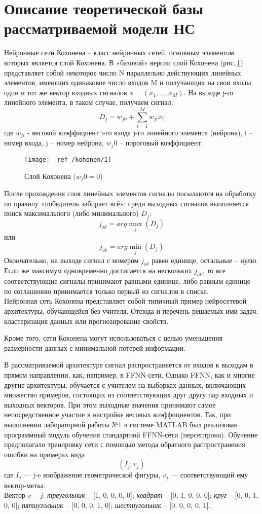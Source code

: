 \documentclass[12pt,a4paper]{article}
\begin{document}
\section{Описание теоретической базы рассматриваемой \newline модели НС}
Нейронные сети Кохонена – класс нейронных сетей, основным элементом которых является слой Кохонена. В «базовой» версии слой Кохонена (рис.\,\ref{fig:01}) 
представляет собой некоторое число N параллельно действующих линейных элементов, имеющих одинаковое число входов M и получающих на свои входы один и тот же вектор входных сигналов $x = (x_1, ..., x_M)$. На выходе j-го линейного элемента, в таком случае, получаем сигнал:
$$D_j = w_{j0} + \sum\limits_{i=1}^{M} w_{ji} x_i $$
где $w_{ji}$ - весовой коэффициент i-го входа j-го линейного элемента (нейрона), i – номер входа, j – номер нейрона, $w_j0$ – пороговый коэффициент.

\begin{figure}[h!]
	\centering
	\texttt{[image: \_ref\_/kohonen/1]}
	\caption{Слой Кохонена ($w_j0 = 0$)\label{fig:01}}
\end{figure}

После прохождения слоя линейных элементов сигналы посылаются на обработку по правилу «победитель забирает всё»: среди выходных сигналов выполняется поиск максимального (либо минимального) $D_j$:
$$ j_{ok} = arg\max_{j}(D_j) $$
или
$$ j_{ok} = arg\min_{j}(D_j) $$
Окончательно, на выходе сигнал с номером $j_{ok}$ равен единице, остальные – нулю. Если же максимум одновременно достигается на нескольких $j_{ok}$, то все соответствующие сигналы принимают равными единице, либо равным единице по соглашению принимается только первый из сигналов в списке. \\

Нейронная сеть Кохонена представляет собой типичный пример нейросетевой архитектуры, обучающейся без учителя. Отсюда и перечень решаемых ими задач: кластеризация данных или прогнозирование свойств. 

Кроме того, сети Кохонена могут использоваться с целью уменьшения размерности данных с минимальной потерей информации. 

В рассматриваемой архитектуре сигнал распространяется от входов к выходам в прямом направлении, как, например, в FFNN-сети. Однако FFNN, как и многие другие архитектуры, обучается с учителем на выборках данных, включающих множество примеров, состоящих из соответствующих друг другу пар входных и выходных векторов. При этом выходные значения принимают самое непосредственное участие в настройке весовых коэффициентов. Так, при выполнении лабораторной работы №1 в системе MATLAB был реализован программный модуль обучения стандартной FFNN-сети (персептрона). Обучение предполагало тренировку сети с помощью метода обратного распространения ошибки на примерах вида 
$$\left(I_j; v_j\right)$$
где $I_j$ — j-e изображение геометрической фигуры, $v_j$ — соответствующий ему вектор-метка.\\
Вектор $v-j$: \emph{треугольник} -- [1, 0, 0, 0, 0]; \emph{квадрат} -- [0, 1, 0, 0, 0]; \emph{круг} -- [0, 0, 1, 0, 0]; \emph{пятиугольник} -- [0, 0, 0, 1, 0];  \emph{шестиугольник} -- [0, 0, 0, 0, 1].
\end{document}
